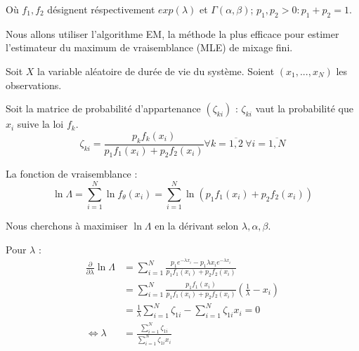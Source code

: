 \documentclass[10pt,a4paper]{article}
\begin{document}
Où $f_1, f_2$ désignent réspectivement $exp(\lambda)$ et $\Gamma(\alpha, \beta)$; $p_1, p_2 > 0: p_1 + p_2 = 1$.

Nous allons utiliser l'algorithme EM, la méthode la plus efficace pour estimer l'estimateur du maximum de vraisemblance (MLE) de mixage fini.

Soit $X$ la variable aléatoire de durée de vie du système. Soient $\left( {{x_1},...,{x_N}} \right)$ les observations.

Soit la matrice de probabilité d'appartenance $(\zeta_{ki})$ : $\zeta_{ki}$ vaut la probabilité que $x_i$ suive la loi $f_k$.
\begin{equation}
    \label{zeta}
    {\zeta _{ki}} = \frac{{{p_k}{f_k}\left( {{x_i}} \right)}}{{{p_1}{f_1}\left( {{x_i}} \right) + {p_2}{f_2}\left( {{x_i}} \right)}}\forall k = \overline {1,2}\ \forall i = \overline {1,N}
\end{equation}

La fonction de vraisemblance : 
\begin{equation}
    \label{funlik}
    \ln \Lambda  = \sum\limits_{i = 1}^N {\ln {f_\theta }\left( {{x_i}} \right)}  = \sum\limits_{i = 1}^N {\ln \left( {{p_1}{f_1}\left( {{x_i}} \right) + {p_2}{f_2}\left( {{x_i}} \right)} \right)}
\end{equation}

Nous cherchons à maximiser $\ln \Lambda$ en la dérivant selon $\lambda, \alpha, \beta$.

Pour $\lambda$ :
\begin{align}
    \frac{\partial }{{\partial \lambda }}\ln \Lambda  & = \sum\limits_{i = 1}^N {\frac{{{p_1}{e^{ - \lambda {x_i}}} - {p_1}\lambda {x_i}{e^{ - \lambda {x_i}}}}}{{{p_1}{f_1}\left( {{x_i}} \right) + {p_2}{f_2}\left( {{x_i}} \right)}}} \nonumber \\
    & = \sum\limits_{i = 1}^N {\frac{{{p_1}{f_1}\left( {{x_i}} \right)}}{{{p_1}{f_1}\left( {{x_i}} \right) + {p_2}{f_2}\left( {{x_i}} \right)}}\left( {\frac{1}{\lambda } - {x_i}} \right)} \nonumber  \\
    & = \frac{1}{\lambda }\sum\limits_{i = 1}^N {{\zeta _{1i}}}  - \sum\limits_{i = 1}^N {{\zeta _{1i}}{x_i}}  = 0 \nonumber \\
    \label{lambda}
    \Leftrightarrow \lambda  & = \frac{{\sum\limits_{i = 1}^N {{\zeta _{1i}}} }}{{\sum\limits_{i = 1}^N {{\zeta _{1i}}{x_i}} }}
\end{align}
\end{document}
